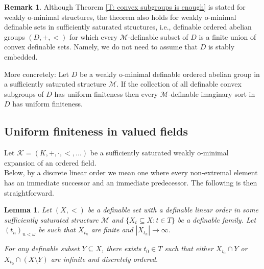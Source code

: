 \documentclass[11pt]{amsart}
\newtheorem{lemma}[theorem]{Lemma}
\theoremstyle{definition}
\newtheorem{remark}[theorem]{Remark}
\newcommand{\CK}{{\mathcal K}}
\newcommand{\CM}{{\mathcal M}}
\newcommand{\0}{\emptyset}
\begin{document}
\begin{remark}\label{R: Thm ok for def wom}
    Although Theorem \ref{T: convex subgroups is enough} is stated for weakly o-minimal structures, the theorem also holds for weakly o-minimal definable sets in sufficiently saturated structures, i.e., definable ordered abelian groups $(D,+,<)$ for which every $\CM$-definable subset of $D$ is a finite union of convex definable sets. Namely, we do not need to assume that $D$ is stably embedded.

    More concretely: Let $D$ be a weakly o-minimal definable ordered abelian group in a sufficiently saturated structure $\CM$. If the collection of all definable convex subgroups of $D$ has uniform finiteness then every $\CM$-definable imaginary sort in $D$ has uniform finiteness.
\end{remark}


\subsection{Uniform finiteness in valued fields}


Let $\CK=(K,+,\cdot,<,\dots)$ be a sufficiently saturated weakly o-minimal expansion of an ordered field.\\

Below, by a discrete linear order we mean one where every non-extremal element has an immediate successor and an immediate predecessor. The following is then straightforward.
\begin{lemma}\label{L:union of discrete}
    Let $(X,<)$ be a definable set with a definable linear order in some sufficiently saturated structure $\CM$ and $\{X_t\subseteq X:t\in T\}$ be a definable family.  Let $(t_n)_{n<\omega}$ be such that $X_{t_n}$ are finite and $|X_{t_n}|\to \infty$.

    For any definable subset $Y\subseteq X$,  there exists $t_0\in T$ such that either $X_{t_0}\cap Y$ or $X_{t_0}\cap (X\setminus Y)$ are infinite and discretely ordered. 
\end{lemma}
\end{document}
